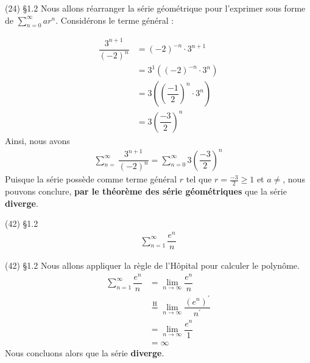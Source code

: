 \documentclass{report}
\begin{document}
\begin{multicols*}{3}
        \begin{Reponse}{(24) \S 1.2}{}
            Nous allons réarranger la série géométrique pour l'exprimer 
            sous forme de $\sum_{n=0}^{\infty }ar^n$. 
            Considérons le terme général : 

            \begin{align*}
                \dfrac{3^{n+1}}{(-2)^n} &= 
                (-2)^{-n}\cdot 3^{n+1} \\ 
                                    &=
                3^1\left( (-2)^{-n} \cdot 3^n \right) \\
                                    &= 
                3\left( \left(\dfrac{-1}{2}\right)^n \cdot 3^n \right) \\ 
                                    &= 
                3\left( \dfrac{-3}{2} \right)^n
            \end{align*}
            Ainsi, nous avons 
            \begin{align*}
                \sum_{n=}^{\infty}\dfrac{3^{n+1}}{(-2)^n} = 
                \sum_{n=0}^{\infty}3\left( \dfrac{-3}{2} \right)^n
            \end{align*}
            Puisque la série possède comme terme général $r$ tel que 
            $r =\frac{-3}{2} \geq 1$ et $a \neq$, nous pouvons 
            conclure, \textbf{par le théorème des série géométriques} 
            que la série \textbf{diverge}.   
           
        \end{Reponse}


        \begin{Exercice}{ (42) \S 1.2}{}
            \begin{align*}
                \sum_{n=1}^{\infty}\dfrac{e^n}{n}
            \end{align*}
        \end{Exercice}

        \begin{Reponse}{ (42) \S 1.2}{}
            Nous allons appliquer la règle de l'Hôpital pour calculer 
            le polynôme.  
            \begin{align*}
                \sum_{n=1}^{\infty}\dfrac{e^n}{n} &= 
                 \lim\limits_{n\to\infty}\dfrac{e^n}{n} \\ 
                                      &\overset{\mathrm{H}}{=}
            \lim\limits_{n\to\infty}\dfrac{(e^n)^{\prime}}{n^{\prime}} \\
                                    &=
            \lim\limits_{n\to\infty}\dfrac{e^n}{1} \\ 
                                    &= \infty
            \end{align*}
            Nous concluons alors que la série \textbf{diverge}.   
        \end{Reponse}



\end{multicols*}
\end{document}
